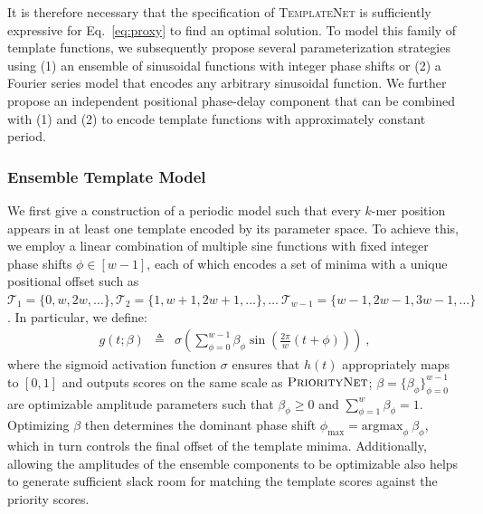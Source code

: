 It is therefore necessary that the specification of \textsc{TemplateNet} is sufficiently expressive for Eq.~\ref{eq:proxy} to find an optimal solution. To model this family of template functions, we subsequently propose several parameterization strategies using (1) an ensemble of sinusoidal functions with integer phase shifts or (2) a Fourier series model that encodes any arbitrary sinusoidal function. We further propose an independent positional phase-delay component that can be combined with (1) and (2) to encode template functions with approximately constant period.

\subsubsection{Ensemble Template Model}
\label{sec:ensemble}
We first give a construction of a periodic model such that every $k$-mer position appears in at least one template encoded by its parameter space. To achieve this, we employ a linear combination of multiple sine functions with fixed integer phase shifts  $\phi \in [w-1]$, each of which encodes a set of minima with a unique positional offset such as $\mathcal{T}_1=\{0, w, 2w, \dots\}, \mathcal{T}_2=\{1, w+1, 2w+1, \dots\}, \dots \ \mathcal{T}_{w-1}=\{w-1, 2w-1, 3w-1, \dots \}$. In particular, we define:
\begin{eqnarray}
g(t; \beta) &\triangleq& \sigma\left(\sum_{\phi=0}^{w-1} \beta_{\phi}\sin\left(\frac{2\pi}{w}(t + \phi)\right) \right) \ ,
\end{eqnarray}
where the sigmoid activation function $\sigma$ ensures that $h(t)$ appropriately maps to $[0, 1]$ and outputs scores on the same scale as $\textsc{PriorityNet}$; $\beta = \{\beta_{\phi}\}_{\phi=0}^{w-1}$ are optimizable amplitude parameters such that $\beta_\phi \geq 0$ and  $\sum_{\phi=1}^w\beta_{\phi} = 1$. Optimizing $\beta$ then determines the dominant phase shift $\phi_{\mathrm{max}} = \mathrm{argmax}_{\phi}\ \beta_{\phi}$, which in turn controls the final offset of the template minima. Additionally, allowing the amplitudes of the ensemble components to be optimizable also helps to generate sufficient slack room for matching the template scores against the priority scores.
